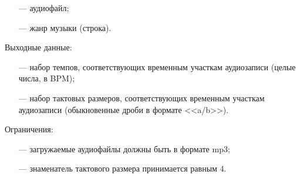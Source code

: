 \begin{itemize}
	\item[---] аудиофайл;
	\item[---] жанр музыки (строка).
\end{itemize}

Выходные данные:

\begin{itemize}
	\item[---] набор темпов, соответствующих временным участкам аудиозаписи (целые числа, в BPM);
	\item[---] набор тактовых размеров, соответствующих временным участкам аудиозаписи (обыкновенные дроби в формате <<a/b>>).
\end{itemize}

Ограничения:

\begin{itemize}
	\item[---] загружаемые аудиофайлы должны быть в формате mp3;
	\item[---] знаменатель тактового размера принимается равным 4.
\end{itemize}
